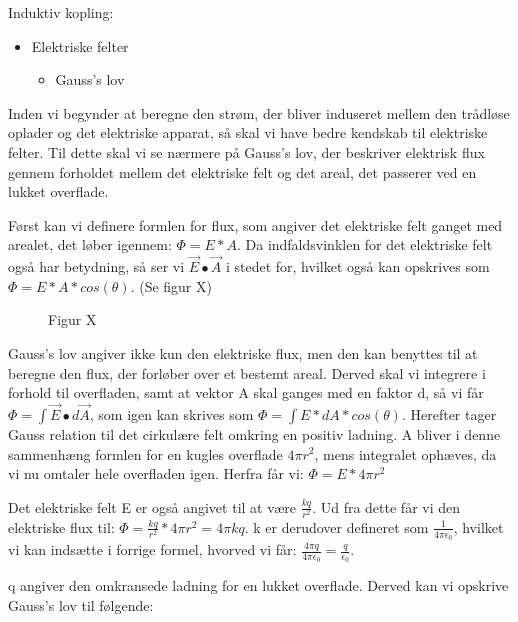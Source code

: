 

Induktiv kopling:
\begin{itemize}
\item Elektriske felter
\begin{itemize}
\item Gauss's lov
\end{itemize}
\end{itemize}

Inden vi begynder at beregne den strøm, der bliver induseret mellem den trådløse oplader og det elektriske apparat, så skal vi have bedre kendskab til elektriske felter. Til dette skal vi se nærmere på Gauss's lov, der beskriver elektrisk flux gennem forholdet mellem det elektriske felt og det areal, det passerer ved en lukket overflade.

Først kan vi definere formlen for flux, som angiver det elektriske felt ganget med arealet, det løber igennem: $\Phi = E * A$. Da indfaldsvinklen for det elektriske felt også har betydning, så ser vi $\vec{E} \bullet \vec{A}$ i stedet for, hvilket også kan opskrives som $\Phi = E * A * cos(\theta)$. (Se figur X)

\begin{figure}[H]
\centering
\caption{Figur X}
\end{figure}

Gauss's lov angiver ikke kun den elektriske flux, men den kan benyttes til at beregne den flux, der forløber over et bestemt areal. Derved skal vi integrere i forhold til overfladen, samt at vektor A skal ganges med en faktor d, så vi får $\Phi = \int \vec{E} \bullet d \vec{A}$, som igen kan skrives som $\Phi = \int E * dA * cos(\theta)$. Herefter tager Gauss relation til det cirkulære felt omkring en positiv ladning. A bliver i denne sammenhæng formlen for en kugles overflade $4 \pi r^2$, mens integralet ophæves, da vi nu omtaler hele overfladen igen. Herfra får vi: $\Phi = E * 4 \pi r^2$

Det elektriske felt E er også angivet til at være $\frac{kq}{r^2}$. Ud fra dette får vi den elektriske flux til: $\Phi = \frac{kq}{r^2} * 4 \pi r^2 = 4 \pi k q$. k er derudover defineret som $\frac{1}{4 \pi \epsilon_0}$, hvilket vi kan indsætte i forrige formel, hvorved vi får: $\frac{4 \pi q}{4 \pi \epsilon_0} = \frac{q}{\epsilon_0}$.

q angiver den omkransede ladning for en lukket overflade. Derved kan vi opskrive Gauss's lov til følgende:

